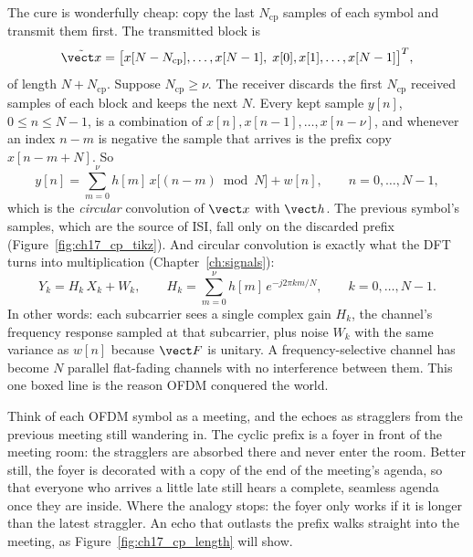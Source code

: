 The cure is wonderfully cheap: copy the last $N_{\text{cp}}$ samples of each symbol and transmit
them first. The transmitted block is
\begin{equation}
\tilde{\vect x}=\big[x[N-N_{\text{cp}}],\dots,x[N-1],\;x[0],x[1],\dots,x[N-1]\big]^T,
\end{equation}
of length $N+N_{\text{cp}}$. Suppose $N_{\text{cp}}\ge\nu$. The receiver discards the first
$N_{\text{cp}}$ received samples of each block and keeps the next $N$. Every kept sample
$y[n]$, $0\le n\le N-1$, is a combination of $x[n],x[n-1],\dots,x[n-\nu]$, and whenever an index
$n-m$ is negative the sample that arrives is the prefix copy $x[n-m+N]$. So
\begin{equation}
y[n]=\sum_{m=0}^{\nu}h[m]\,x\big[(n-m)\bmod N\big]+w[n],\qquad n=0,\dots,N-1,
\label{eq:ch17:circ}
\end{equation}
which is the \emph{circular} convolution of $\vect x$ with $\vect h$. The previous symbol's
samples, which are the source of ISI, fall only on the discarded prefix
(Figure~\ref{fig:ch17_cp_tikz}). And circular convolution is exactly what the DFT turns into
multiplication (Chapter~\ref{ch:signals}):
\begin{equation}
\boxed{\;Y_k=H_k\,X_k+W_k,\qquad H_k=\sum_{m=0}^{\nu}h[m]\,e^{-j2\pi km/N},\qquad k=0,\dots,N-1.\;}
\label{eq:ch17:onetap}
\end{equation}
In other words: each subcarrier sees a single complex gain $H_k$, the channel's frequency response
sampled at that subcarrier, plus noise $W_k$ with the same variance as $w[n]$ because $\vect F$ is
unitary. A frequency-selective channel has become $N$ parallel flat-fading channels with no
interference between them. This one boxed line is the reason OFDM conquered the world.

\begin{analogy}
Think of each OFDM symbol as a meeting, and the echoes as stragglers from the previous meeting
still wandering in. The cyclic prefix is a foyer in front of the meeting room: the stragglers are
absorbed there and never enter the room. Better still, the foyer is decorated with a copy of the
end of the meeting's agenda, so that everyone who arrives a little late still hears a complete,
seamless agenda once they are inside. Where the analogy stops: the foyer only works if it is
longer than the latest straggler. An echo that outlasts the prefix walks straight into the
meeting, as Figure~\ref{fig:ch17_cp_length} will show.
\end{analogy}

